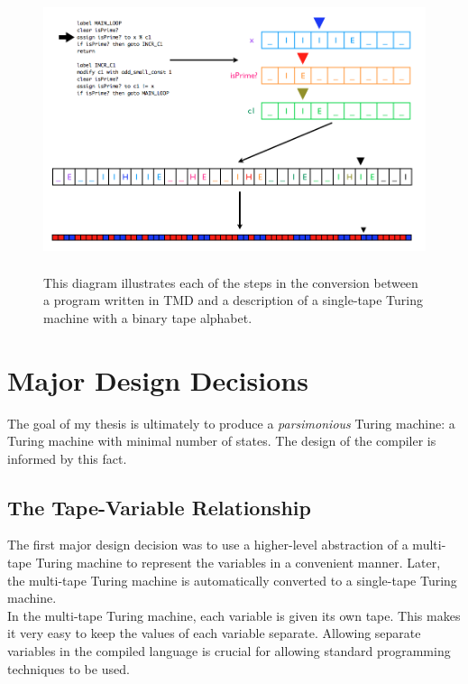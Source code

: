 \documentclass{report}
\begin{document}
\begin{figure} 
\begin{center} 
\includegraphics[height=3.25in,width=5in,angle=0]{figs/process.png} 
\caption{This diagram illustrates each of the steps in the conversion between a program written in TMD and a description of a single-tape Turing machine with a binary tape alphabet.\label{fig:process}} 
\end{center} 
\end{figure}  

\section{Major Design Decisions}

The goal of my thesis is ultimately to produce a \emph{parsimonious} Turing machine: a Turing machine with minimal number of states. The design of the compiler is informed by this fact. \\

\subsection{The Tape-Variable Relationship}

The first major design decision was to use a higher-level abstraction of a multi-tape Turing machine to represent the variables in a convenient manner. Later, the multi-tape Turing machine is automatically converted to a single-tape Turing machine.  \\

In the multi-tape Turing machine, each variable is given its own tape. This makes it very easy to keep the values of each variable separate. Allowing separate variables in the compiled language is crucial for allowing standard programming techniques to be used. \\
\end{document}
